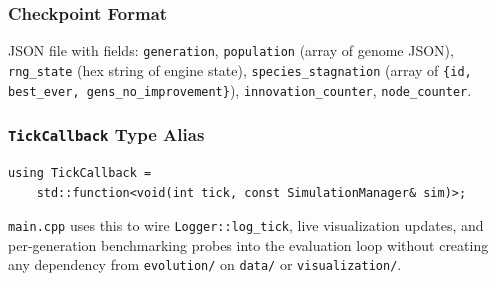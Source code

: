 \subsubsection{Checkpoint Format}

JSON file with fields: \texttt{generation}, \texttt{population} (array of genome JSON),
\texttt{rng\_state} (hex string of engine state), \texttt{species\_stagnation} (array of
\texttt{\{id, best\_ever, gens\_no\_improvement\}}), \texttt{innovation\_counter},
\texttt{node\_counter}.

\subsubsection{\texttt{TickCallback} Type Alias}

\begin{lstlisting}
using TickCallback =
    std::function<void(int tick, const SimulationManager& sim)>;
\end{lstlisting}

\texttt{main.cpp} uses this to wire \texttt{Logger::log\_tick}, live visualization
updates, and per-generation benchmarking probes into the evaluation loop without creating
any dependency from \texttt{evolution/} on \texttt{data/} or \texttt{visualization/}.
